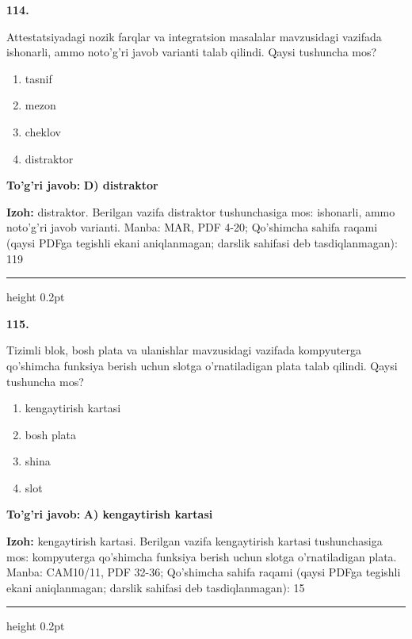 \documentclass[10pt,a4paper]{article}
\begin{document}
{\bfseries\sffamily\color{ink} 114.}
\par
Attestatsiyadagi nozik farqlar va integratsion masalalar mavzusidagi vazifada ishonarli, ammo noto'g'ri javob varianti talab qilindi. Qaysi tushuncha mos?
\begin{enumerate}[label=\Alph*),leftmargin=9mm]
\item tasnif
\item mezon
\item cheklov
\item distraktor
\end{enumerate}
\begin{tcolorbox}[enhanced,breakable,colback=teal!4,colframe=teal!60!black,boxrule=0.45pt,arc=1.2mm,left=2.7mm,right=2.7mm,top=1.8mm,bottom=1.8mm,before skip=2mm,after skip=2mm]
{\bfseries\sffamily\color{teal}To'g'ri javob:} \textbf{D) distraktor}
\par\smallskip
{\bfseries Izoh:} distraktor. Berilgan vazifa distraktor tushunchasiga mos: ishonarli, ammo noto'g'ri javob varianti. Manba: MAR, PDF 4-20; Qo'shimcha sahifa raqami (qaysi PDFga tegishli ekani aniqlanmagan; darslik sahifasi deb tasdiqlanmagan): 119
\end{tcolorbox}
\vspace{2mm}\hrule height 0.2pt\vspace{3mm}

{\bfseries\sffamily\color{ink} 115.}
\par
Tizimli blok, bosh plata va ulanishlar mavzusidagi vazifada kompyuterga qo'shimcha funksiya berish uchun slotga o'rnatiladigan plata talab qilindi. Qaysi tushuncha mos?
\begin{enumerate}[label=\Alph*),leftmargin=9mm]
\item kengaytirish kartasi
\item bosh plata
\item shina
\item slot
\end{enumerate}
\begin{tcolorbox}[enhanced,breakable,colback=teal!4,colframe=teal!60!black,boxrule=0.45pt,arc=1.2mm,left=2.7mm,right=2.7mm,top=1.8mm,bottom=1.8mm,before skip=2mm,after skip=2mm]
{\bfseries\sffamily\color{teal}To'g'ri javob:} \textbf{A) kengaytirish kartasi}
\par\smallskip
{\bfseries Izoh:} kengaytirish kartasi. Berilgan vazifa kengaytirish kartasi tushunchasiga mos: kompyuterga qo'shimcha funksiya berish uchun slotga o'rnatiladigan plata. Manba: CAM10/11, PDF 32-36; Qo'shimcha sahifa raqami (qaysi PDFga tegishli ekani aniqlanmagan; darslik sahifasi deb tasdiqlanmagan): 15
\end{tcolorbox}
\vspace{2mm}\hrule height 0.2pt\vspace{3mm}
\end{document}
